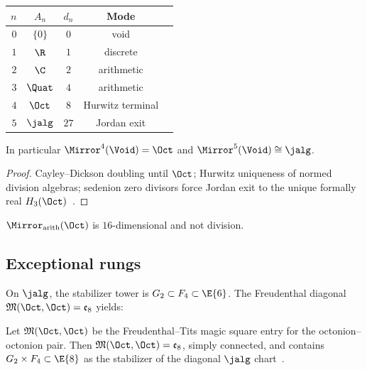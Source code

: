 \begin{theorem}\label{thm:rung-table}
\begin{center}
\renewcommand{\arraystretch}{1.15}
\begin{tabular}{@{}rcccc@{}}
\toprule
$n$ & $A_n$ & $d_n$ & Mode & \\
\midrule
$0$ & $\{0\}$ & $0$ & void & \\
$1$ & $\R$ & $1$ & discrete & \\
$2$ & $\C$ & $2$ & arithmetic & \\
$3$ & $\Quat$ & $4$ & arithmetic & \\
$4$ & $\Oct$ & $8$ & Hurwitz terminal & \\
$5$ & $\jalg$ & $27$ & Jordan exit & \\
\bottomrule
\end{tabular}
\end{center}
In particular $\Mirror^4(\Void)=\Oct$ and $\Mirror^5(\Void)\cong\jalg$.
\end{theorem}

\begin{proof}
Cayley--Dickson doubling until $\Oct$; Hurwitz uniqueness of normed division
algebras; sedenion zero divisors force Jordan exit to the unique formally real
$H_3(\Oct)$~\cite{Hurwitz1898,SpringerVeldkamp2000}.
\end{proof}

\begin{lemma}\label{lem:sedenion}
$\Mirror_{\mathrm{arith}}(\Oct)$ is $16$-dimensional and not division.
\end{lemma}

\subsection{Exceptional rungs}
\label{sec:climb:exceptional}

On $\jalg$, the stabilizer tower is $G_2\subset F_4\subset\E{6}$. The
Freudenthal diagonal $\mathfrak{M}(\Oct,\Oct)=\mathfrak{e}_8$ yields:

\begin{lemma}\label{lem:freudenthal}
Let $\mathfrak{M}(\Oct,\Oct)$ be the Freudenthal--Tits magic square entry for
the octonion--octonion pair. Then $\mathfrak{M}(\Oct,\Oct)=\mathfrak{e}_8$,
simply connected, and contains $G_2\times F_4\subset\E{8}$ as the stabilizer of
the diagonal $\jalg$ chart~\cite{Freudenthal1954,Tits1966}.
\end{lemma}

